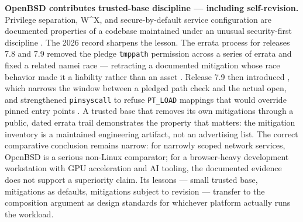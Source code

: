 \documentclass[
  english,
  9pt,
]{extarticle}
\begin{document}
\textbf{OpenBSD contributes trusted-base discipline --- including
self-revision.} Privilege separation, W\^{}X, and secure-by-default
service configuration are documented properties of a codebase maintained
under an unusual security-first discipline
\citep{openbsd_security, openbsd_innovations}. The 2026 record sharpens
the lesson. The errata process for releases 7.8 and 7.9 removed the
pledge \texttt{tmppath} permission across a series of errata and fixed a
related namei race --- retracting a documented mitigation whose race
behavior made it a liability rather than an asset
\citep{openbsd_errata78}. Release 7.9 then introduced
, which narrows the window between a pledged
path check and the actual open, and strengthened \texttt{pinsyscall} to
refuse \texttt{PT\_LOAD} mappings that would override pinned entry
points \citep{openbsd_79}. A trusted base that removes its own
mitigations through a public, dated errata trail demonstrates the
property that matters: the mitigation inventory is a maintained
engineering artifact, not an advertising list. The correct comparative
conclusion remains narrow: for narrowly scoped network services, OpenBSD
is a serious non-Linux comparator; for a browser-heavy development
workstation with GPU acceleration and AI tooling, the documented
evidence does not support a superiority claim. Its lessons --- small
trusted base, mitigations as defaults, mitigations subject to revision
--- transfer to the composition argument as design standards for
whichever platform actually runs the workload.
\end{document}
